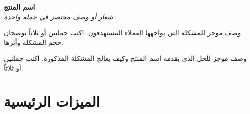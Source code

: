 \documentclass[11pt,a4paper]{article}
\begin{document}
\thispagestyle{fancy}

\noindent\colorbox{accentdark}{\parbox{\dimexpr\textwidth-2\fboxsep\relax}{%
\vspace{0.3em}
\begin{center}
{\color{white}\Huge\bfseries اسم المنتج}\\[0.1em]
{\color{white}\large\itshape شعار أو وصف مختصر في جملة واحدة}
\end{center}
\vspace{0.2em}
}}

\vspace{0.5em}

\noindent
\begin{minipage}[t]{0.48\textwidth}
\begin{problembox}
وصف موجز للمشكلة التي يواجهها العملاء المستهدفون.%
اكتب جملتين أو ثلاثاً توضحان حجم المشكلة وأثرها.
\end{problembox}
\end{minipage}\hfill
\begin{minipage}[t]{0.48\textwidth}
\begin{solutionbox}
وصف موجز للحل الذي يقدمه اسم المنتج وكيف يعالج%
المشكلة المذكورة. اكتب جملتين أو ثلاثاً.
\end{solutionbox}
\end{minipage}

\vspace{0.4em}

\section{الميزات الرئيسية}
\end{document}
